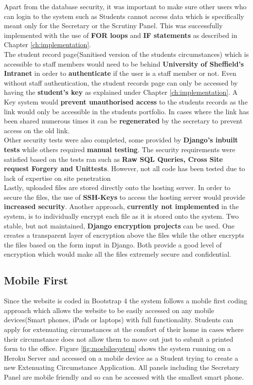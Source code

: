 \documentclass[../main.tex]{subfiles}
\begin{document}
Apart from the database security, it was important to make sure other users who can login to the system such as Students cannot access data which is specifically meant only for the Secretary or the Scrutiny Panel. This was successfully implemented with the use of \textbf{FOR loops} and \textbf{IF statements} as described in Chapter \ref{ch:implementation}. \\[4mm]

The student record page(Sanitised version of the students circumstances) which is accessible to staff members would need to be behind \textbf{University of Sheffield's Intranet} in order to \textbf{authenticate} if the user is a staff member or not. Even without staff authentication, the student records page can only be accessed by having the \textbf{student's key} as explained under Chapter \ref{ch:implementation}. A Key system would \textbf{prevent unauthorised access} to the students records as the link would only be accessible in the students portfolio. In cases where the link has been shared numerous times it can be \textbf{regenerated} by the secretary to prevent access on the old link.\\[4mm]

Other security tests were also completed, some provided by \textbf{Django's inbuilt tests} while others required \textbf{manual testing}. The security requirements were satisfied based on the tests ran such as \textbf{Raw SQL Queries, Cross Site request Forgery and Unittests}. However, not all code has been tested due to lack of expertise on site penetration \\[4mm]

Lastly, uploaded files are stored directly onto the hosting server. In order to secure the files, the use of \textbf{SSH-Keys} to access the hosting server would provide \textbf{increased security}. Another approach, \textbf{currently not implemented} in the system, is to individually encrypt each file as it is stored onto the system. Two stable, but not maintained, \textbf{Django encryption projects} can be used. One creates a transparent layer of encryption above the files\cite{danielquinn} while the other encrypts the files based on the form input in Django\cite{ruddra}. Both provide a good level of encryption which would make all the files extremely secure and confidential.
\subsection*{Mobile First}
Since the website is coded in Bootstrap 4\cite{bootstrapfour} the system follows a mobile first coding approach which allows the website to be easily accessed on any mobile devices(Smart phones, iPads or laptops) with full functionality. Students can apply for extenuating circumstances at the comfort of their home in cases where their circumstance does not allow them to move out just to submit a printed form to the office. Figure \ref{fig:mosbilesystem} shows the system running on a Heroku Server and accessed on a mobile device as a Student trying to create a new Extenuating Circumstance Application. All panels including the Secretary Panel are mobile friendly and so can be accessed with the smallest smart phone. 
\end{document}

